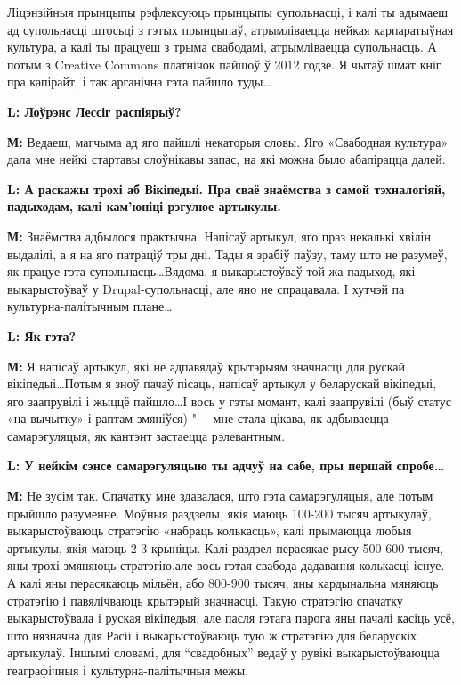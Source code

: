 \documentclass[10pt, a5paper]{article}
\begin{document}
Ліцэнзійныя прынцыпы рэфлексуюць прынцыпы супольнасці, і калі ты адымаеш ад супольнасці штосьці з гэтых прынцыпаў, атрымліваецца нейкая карпаратыўная культура, а калі ты працуеш з трыма свабодамі, атрымліваецца супольнасць. А потым з Creatіve Commons платнічок пайшоў ў 2012 годзе. Я чытаў шмат кніг пра капірайт, і так арганічна гэта пайшло туды\ldots
 

{\noindent \bf L: Лоўрэнс Лессіг распіярыў?}

{\noindent \bf М:} Ведаеш, магчыма ад яго пайшлі некаторыя словы. Яго «Свабодная культура» дала мне нейкі стартавы слоўнікавы запас, на які можна было абапірацца далей.

{\noindent \bf L: А раскажы трохі аб Вікіпедыі. Пра сваё знаёмства з самой тэхналогіяй, падыходам, калі кам'юніці рэгулюе артыкулы.}

{\noindent \bf М:} Знаёмства адбылося практычна. Напісаў артыкул, яго праз не\-калькі хвілін выдалілі, а я на яго патраціў тры дні. Тады я зрабіў паўзу, таму што не разумеў, як працуе гэта супольнасць\ldots Вядома, я выкарыстоўваў той жа падыход, які выкарыстоўваў у Drupal-супольнасці, але яно не спрацавала. І хутчэй па культурна-палі\-тычным плане\ldots

{\noindent \bf L: Як гэта?}

{\noindent \bf М:} Я напісаў артыкул, які не адпавядаў крытэрыям значнасці для рускай вікіпедыі\ldots Потым я зноў пачаў пісаць, напісаў артыкул у беларускай вікіпедыі, яго заапрувілі і жыццё пайшло\ldots І вось у гэты момант, калі заапрувілі (быў статус «на вычытку» і раптам змяніўся) "--- мне стала цікава, як адбываецца самарэгуляцыя, як кантэнт застаецца рэлевантным.

{\noindent \bf L: У нейкім сэнсе самарэгуляцыю ты адчуў на сабе, пры першай спробе\ldots}

{\noindent \bf М:} Не зусім так. Спачатку мне здавалася, што гэта самарэгуляцыя, але потым прыйшло разуменне. Моўныя раздзелы, якія маюць 100-200 тысяч артыкулаў, выкарыстоўваюць стратэгію «набраць колькасць», калі прымаюцца любыя артыкулы, якія маюць 2-3 крыніцы. Калі раздзел перасякае рысу 500-600 тысяч, яны трохі змяняюць стратэгію,але вось гэтая свабода дадавання колькасці існуе. А калі яны перасякаюць мільён, або 800-900 тысяч, яны кардынальна мяняюць стратэгію і павялічваюць крытэрый значнасці. Такую стратэгію спачатку выкарыстоўвала і руская вікіпедыя, але пасля гэтага парога яны пачалі касіць усё, што нязначна для Расіі і выкарыстоўваюць тую ж стратэгію для беларускіх артыкулаў. Іншымі словамі, для “свадобных” ведаў у рувікі выкарыстоўваюцца геаграфічныя і культурна-палітычныя межы.
\end{document}
